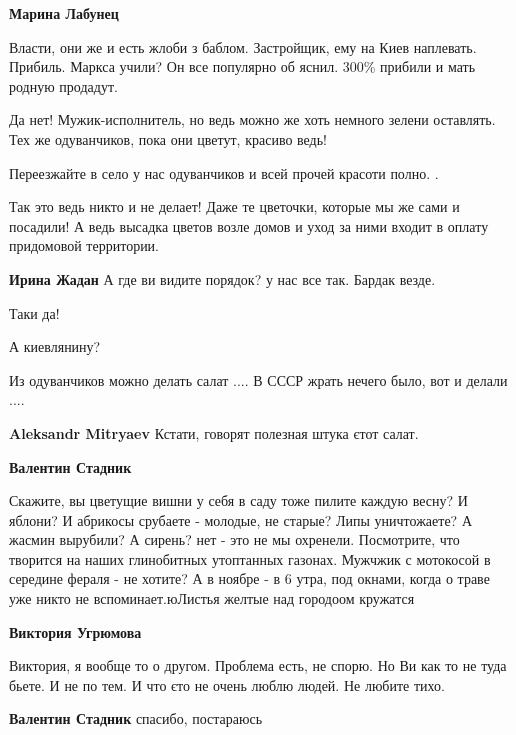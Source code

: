 \begin{itemize}
\begin{itemize}
\begin{itemize} %
\textbf{Марина Лабунец} 

Власти, они же и есть жлоби з баблом. Застройщик, ему на Киев
наплевать. Прибиль. Маркса учили? Он все популярно об яснил. 300\% прибили и мать
родную продадут.

\end{itemize} %

Да нет! Мужик-исполнитель, но ведь можно же хоть немного зелени оставлять. Тех
же одуванчиков, пока они цветут, красиво ведь!


Переезжайте в село у нас одуванчиков и всей прочей красоти полно.
.


Так это ведь никто и не делает! Даже те цветочки, которые мы же сами и
посадили! А ведь высадка цветов возле домов и уход за ними входит в оплату
придомовой территории.

\textbf{Ирина Жадан} А где ви видите порядок? у нас все так. Бардак везде.

Таки да!

А киевлянину?

Из одуванчиков можно делать салат .... В СССР жрать нечего было, вот и делали ....

\textbf{Aleksandr Mitryaev} Кстати, говорят полезная штука єтот салат.

\textbf{Валентин Стадник} 

Скажите, вы цветущие вишни у себя в саду тоже пилите каждую весну? И яблони? И
абрикосы срубаете - молодые, не старые? Липы уничтожаете? А жасмин вырубили? А
сирень? нет - это не мы охренели. Посмотрите, что творится на наших глинобитных
утоптанных газонах. Мужчжик с мотокосой в середине фераля - не хотите? А в
ноябре - в 6 утра, под окнами, когда о траве уже никто не вспоминает.юЛистья
желтые над городоом кружатся

\begin{itemize} %
\textbf{Виктория Угрюмова} 

Виктория, я вообще то о другом. Проблема есть, не спорю. Но Ви как то не туда
бьете. И не по тем. И что єто не очень люблю людей. Не любите тихо.


\textbf{Валентин Стадник} спасибо, постараюсь


\end{itemize}
\end{itemize}
\end{itemize}
